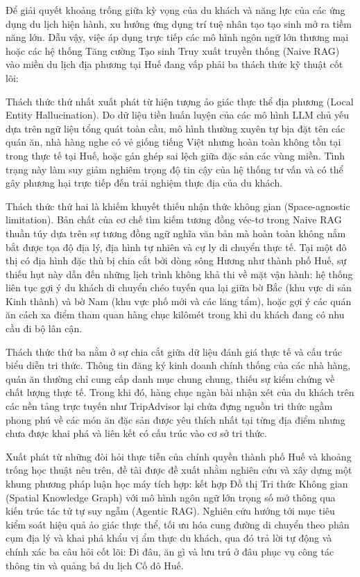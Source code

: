 Để giải quyết khoảng trống giữa kỳ vọng của du khách và năng lực của các ứng dụng du lịch hiện hành, xu hướng ứng dụng trí tuệ nhân tạo tạo sinh mở ra tiềm năng lớn. Dẫu vậy, việc áp dụng trực tiếp các mô hình ngôn ngữ lớn thương mại hoặc các hệ thống Tăng cường Tạo sinh Truy xuất truyền thống (Naive RAG) vào miền du lịch địa phương tại Huế đang vấp phải ba thách thức kỹ thuật cốt lõi:

Thách thức thứ nhất xuất phát từ hiện tượng ảo giác thực thể địa phương (Local Entity Hallucination). Do dữ liệu tiền huấn luyện của các mô hình LLM chủ yếu dựa trên ngữ liệu tổng quát toàn cầu, mô hình thường xuyên tự bịa đặt tên các quán ăn, nhà hàng nghe có vẻ giống tiếng Việt nhưng hoàn toàn không tồn tại trong thực tế tại Huế, hoặc gán ghép sai lệch giữa đặc sản các vùng miền. Tình trạng này làm suy giảm nghiêm trọng độ tin cậy của hệ thống tư vấn và có thể gây phương hại trực tiếp đến trải nghiệm thực địa của du khách.

Thách thức thứ hai là khiếm khuyết thiếu nhận thức không gian (Space-agnostic limitation). Bản chất của cơ chế tìm kiếm tương đồng véc-tơ trong Naive RAG thuần túy dựa trên sự tương đồng ngữ nghĩa văn bản mà hoàn toàn không nắm bắt được tọa độ địa lý, địa hình tự nhiên và cự ly di chuyển thực tế. Tại một đô thị có địa hình đặc thù bị chia cắt bởi dòng sông Hương như thành phố Huế, sự thiếu hụt này dẫn đến những lịch trình không khả thi về mặt vận hành: hệ thống liên tục gợi ý du khách di chuyển chéo tuyến qua lại giữa bờ Bắc (khu vực di sản Kinh thành) và bờ Nam (khu vực phố mới và các lăng tẩm), hoặc gợi ý các quán ăn cách xa điểm tham quan hàng chục kilômét trong khi du khách đang có nhu cầu đi bộ lân cận.

Thách thức thứ ba nằm ở sự chia cắt giữa dữ liệu đánh giá thực tế và cấu trúc biểu diễn tri thức. Thông tin đăng ký kinh doanh chính thống của các nhà hàng, quán ăn thường chỉ cung cấp danh mục chung chung, thiếu sự kiểm chứng về chất lượng thực tế. Trong khi đó, hàng chục ngàn bài nhận xét của du khách trên các nền tảng trực tuyến như TripAdvisor lại chứa đựng nguồn tri thức ngầm phong phú về các món ăn đặc sản được yêu thích nhất tại từng địa điểm nhưng chưa được khai phá và liên kết có cấu trúc vào cơ sở tri thức.

Xuất phát từ những đòi hỏi thực tiễn của chính quyền thành phố Huế và khoảng trống học thuật nêu trên, đề tài \textbf{\tendetai} được đề xuất nhằm nghiên cứu và xây dựng một khung phương pháp luận học máy tích hợp: kết hợp Đồ thị Tri thức Không gian (Spatial Knowledge Graph) với mô hình ngôn ngữ lớn trọng số mở thông qua kiến trúc tác tử tự suy ngẫm (Agentic RAG). Nghiên cứu hướng tới mục tiêu kiểm soát hiệu quả ảo giác thực thể, tối ưu hóa cung đường di chuyển theo phân cụm địa lý và khai phá khẩu vị ẩm thực du khách, qua đó trả lời tự động và chính xác ba câu hỏi cốt lõi: Đi đâu, ăn gì và lưu trú ở đâu phục vụ công tác thông tin và quảng bá du lịch Cố đô Huế.

